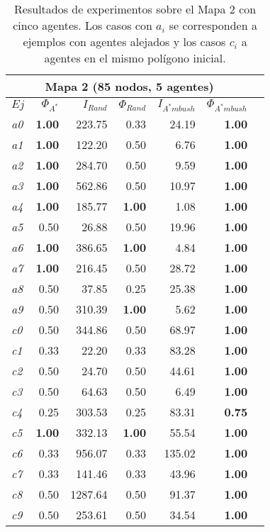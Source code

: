 \begin{table}[htb]
\begin{center}
\begin{tabular}{|l|r|r|r|r|r|r|}
\hline
\multicolumn{6}{|c|}{\textbf{Mapa 2 (85 nodos, 5 agentes)}}\\
\hline
$Ej$ & $\Phi_{A^*}$ & $I_{Rand}$ & $\Phi_{Rand}$
& $I_{A^*mbush}$ & $\Phi_{A^*mbush}$\\
\hline
\textit{a0} & \textbf{1.00} & 223.75 & 0.33 & 24.19 & \textbf{1.00} \\
\textit{a1} & \textbf{1.00} & 122.20 & 0.50 & 6.76 & \textbf{1.00} \\
\textit{a2} & \textbf{1.00} & 284.70 & 0.50 & 9.59 & \textbf{1.00} \\
\textit{a3} & \textbf{1.00} & 562.86 & 0.50 & 10.97 & \textbf{1.00} \\
\textit{a4} & \textbf{1.00} & 185.77 & \textbf{1.00} & 1.08 & \textbf{1.00} \\
\textit{a5} & 0.50 & 26.88 & 0.50 & 19.96 & \textbf{1.00} \\
\textit{a6} & \textbf{1.00} & 386.65 & \textbf{1.00} & 4.84 & \textbf{1.00} \\
\textit{a7} & \textbf{1.00} & 216.45 & 0.50 & 28.72 & \textbf{1.00} \\
\textit{a8} & 0.50 & 37.85 & 0.25 & 25.38 & \textbf{1.00} \\
\textit{a9} & 0.50 & 310.39 & \textbf{1.00} & 5.62 & \textbf{1.00} \\
\hline
\hline
\textit{c0} & 0.50 & 344.86 & 0.50 & 68.97 & \textbf{1.00} \\
\textit{c1} & 0.33 & 22.20 & 0.33 & 83.28 & \textbf{1.00} \\
\textit{c2} & 0.50 & 24.70 & 0.50 & 44.61 & \textbf{1.00} \\
\textit{c3} & 0.50 & 64.63 & 0.50 & 6.49 & \textbf{1.00} \\
\textit{c4} & 0.25 & 303.53 & 0.25 & 83.31 & \textbf{0.75} \\
\textit{c5} & \textbf{1.00} & 332.13 & \textbf{1.00} & 55.54 & \textbf{1.00} \\
\textit{c6} & 0.33 & 956.07 & 0.33 & 135.02 & \textbf{1.00} \\
\textit{c7} & 0.33 & 141.46 & 0.33 & 43.96 & \textbf{1.00} \\
\textit{c8} & 0.50 & 1287.64 & 0.50 & 91.37 & \textbf{1.00} \\
\textit{c9} & 0.50 & 253.61 & 0.50 & 34.54 & \textbf{1.00} \\
\hline
\end{tabular}
\end{center}
	\caption{\label{tab:exp4}
	     Resultados de experimentos sobre el Mapa 2 con cinco agentes. Los casos
	     con $a_i$ se corresponden a ejemplos con agentes alejados
	     y los casos $c_i$ a agentes en el mismo polígono inicial.}
\end{table}